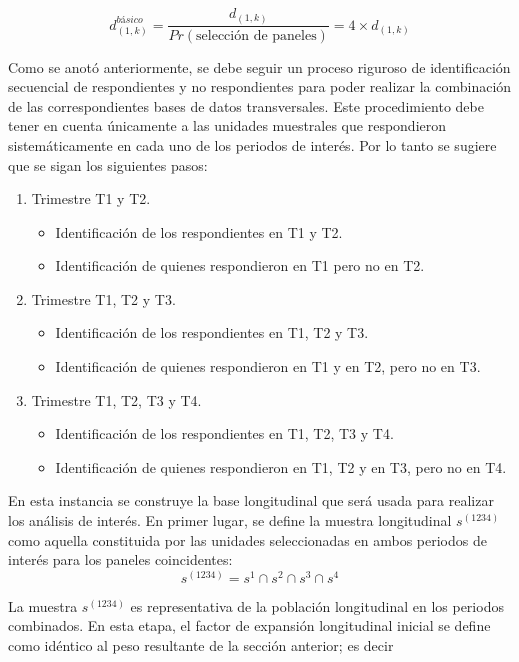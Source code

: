 \documentclass[
  12pt,
]{book}
\providecommand{\tightlist}{%
  \setlength{\itemsep}{0pt}\setlength{\parskip}{0pt}}
\begin{document}
\[
d_{(1,k)}^{básico}= \dfrac{d_{(1,k)}}{Pr(\text{selección de paneles})} = 4 \times d_{(1,k)} 
\]

Como se anotó anteriormente, se debe seguir un proceso riguroso de identificación secuencial de respondientes y no respondientes para poder realizar la combinación de las correspondientes bases de datos transversales. Este procedimiento debe tener en cuenta únicamente a las unidades muestrales que respondieron sistemáticamente en cada uno de los periodos de interés. Por lo tanto se sugiere que se sigan los siguientes pasos:

\begin{enumerate}
\def\labelenumi{\arabic{enumi}.}
\tightlist
\item
  Trimestre T1 y T2.

  \begin{itemize}
  \tightlist
  \item
    Identificación de los respondientes en T1 y T2.
  \item
    Identificación de quienes respondieron en T1 pero no en T2.
  \end{itemize}
\item
  Trimestre T1, T2 y T3.

  \begin{itemize}
  \tightlist
  \item
    Identificación de los respondientes en T1, T2 y T3.
  \item
    Identificación de quienes respondieron en T1 y en T2, pero no en T3.
  \end{itemize}
\item
  Trimestre T1, T2, T3 y T4.

  \begin{itemize}
  \tightlist
  \item
    Identificación de los respondientes en T1, T2, T3 y T4.
  \item
    Identificación de quienes respondieron en T1, T2 y en T3, pero no en T4.
  \end{itemize}
\end{enumerate}

En esta instancia se construye la base longitudinal que será usada para realizar los análisis de interés. En primer lugar, se define la muestra longitudinal \(s^{(1234)}\) como aquella constituida por las unidades seleccionadas en ambos periodos de interés para los paneles coincidentes:
\[
s^{(1234)}=s^1 \cap s^2 \cap s^3 \cap s^4
\]

La muestra \(s^{(1234)}\) es representativa de la población longitudinal en los periodos combinados. En esta etapa, el factor de expansión longitudinal inicial se define como idéntico al peso resultante de la sección anterior; es decir
\end{document}
